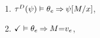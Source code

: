 \begin{definition}
\begin{multicols}{2}
\begin{enumerate}[topsep=0pt,label=(\textsc{w}\arabic*),ref=\textsc{w}\arabic*]
      
    \item \label{write-tau-ca}
      \begin{math}
        \aTr{\bEvs}{\bForm} \rimplies 
        \cForm_\aEv
        \limplies 
        \bForm[\aExp/\aLoc]
      \end{math},
    \item \label{write-term-ca}
      $\aTerm \rimplies \cForm_\aEv \limplies \aExp{=}\aVal_\aEv$,
    \end{enumerate}
  \end{multicols}


\end{definition}
